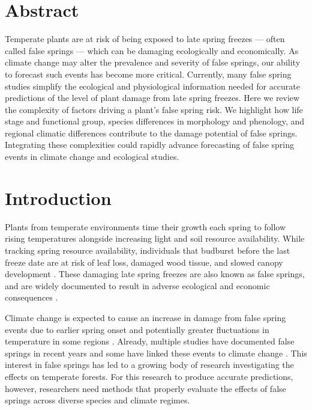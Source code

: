 \documentclass{article}\usepackage[]{graphicx}\usepackage[]{color}
\begin{document}
\section*{Abstract}
Temperate plants are at risk of being exposed to late spring freezes --- often called false springs --- which can be damaging ecologically and economically. As climate change may alter the prevalence and severity of false springs, our ability to forecast such events has become more critical. Currently, many false spring studies simplify the ecological and physiological information needed for accurate predictions of the level of plant damage from late spring freezes. Here we review the complexity of factors driving a plant's false spring risk. We highlight how life stage and functional group, species differences in morphology and phenology, and regional climatic differences contribute to the damage potential of false springs. %
Integrating these complexities could rapidly advance forecasting of false spring events in climate change and ecological studies.

\section*{Introduction}

Plants from temperate environments time their growth each spring to follow rising temperatures alongside increasing light and soil resource availability. While tracking spring resource availability, individuals that budburst before the last freeze date are at risk of leaf loss, damaged wood tissue, and slowed canopy development \citep{Gu2008, Hufkens2012}. These damaging late spring freezes are also known as false springs, and are widely documented to result in adverse ecological and economic consequences \citep{Ault2013, Knudson2012}.

Climate change is expected to cause an increase in damage from false spring events due to earlier spring onset and potentially greater fluctuations in temperature in some regions \citep{Inouye2008, Martin2010}. Already, multiple studies have documented false springs in recent years \citep{Augspurger2009, Augspurger2013, Gu2008, Menzel2015} and some have linked these events to climate change \citep{Allstadt2015, Ault2013,  Muffler2016, Vitra2017, Xin2016}. This interest in false springs has led to a growing body of research investigating the effects on temperate forests. For this research to produce accurate predictions, however, researchers need methods that properly evaluate the effects of false springs across diverse species and climate regimes. 
\end{document}

